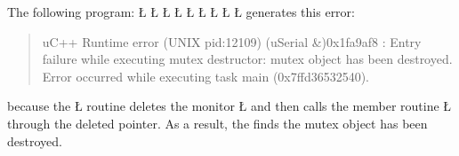 \documentclass[openright,twoside]{report}
\begin{document}
The following program:
\LGinlinefalse\LGbegin\lgrinde
\L{}
\L{}
\L{\LB{}}
\L{\LB{\};}}
\L{}
\L{\LB{}}
\L{\LB{}}
\CE{}\L{\LB{}}
\CE{}\L{\LB{\}}}
\endlgrinde\LGend
generates this error:
\begin{quote}
\BGfont
uC++ Runtime error (UNIX pid:12109) (uSerial \&)0x1fa9af8 : Entry failure while executing mutex destructor: mutex object has been destroyed.
Error occurred while executing task main (0x7ffd36532540).
\end{quote}
because the \LGinlinetrue\LGbegin\lgrinde\L{}\endlgrinde\LGend{} routine deletes the monitor \LGinlinetrue\LGbegin\lgrinde\L{}\endlgrinde\LGend{} and then calls the member routine \LGinlinetrue\LGbegin\lgrinde\L{}\endlgrinde\LGend{} through the deleted pointer.
As a result, the  finds the mutex object has been destroyed.
\end{document}
